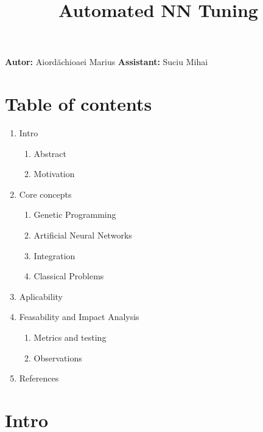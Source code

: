\documentclass[11pt]{article}
\title{Automated NN Tuning}
\begin{document}
    
    
    \maketitle
    
    

    
    \textbf{Autor: }Aiordăchioaei Marius \textbar{} \textbf{Assistant:
}Suciu Mihai

    \hypertarget{table-of-contents}{%
\section*{Table of contents}\label{table-of-contents}}

\begin{enumerate}
\def\labelenumi{\arabic{enumi}.}
\item
  Intro

  \begin{enumerate}
  \def\labelenumii{\arabic{enumii}.}
  \item
    Abstract
  \item
    Motivation
  \end{enumerate}
\item
  Core concepts

  \begin{enumerate}
  \def\labelenumii{\arabic{enumii}.}
  \item
    Genetic Programming
  \item
    Artificial Neural Networks
  \item
    Integration
  \item
    Classical Problems
  \end{enumerate}
\item
  Aplicability
\item
  Feasability and Impact Analysis

  \begin{enumerate}
  \def\labelenumii{\arabic{enumii}.}
  \item
    Metrics and testing
  \item
    Observations
  \end{enumerate}
\item
  References
\end{enumerate}

    \hypertarget{intro}{%
\section{Intro}\label{intro}}
\end{document}
